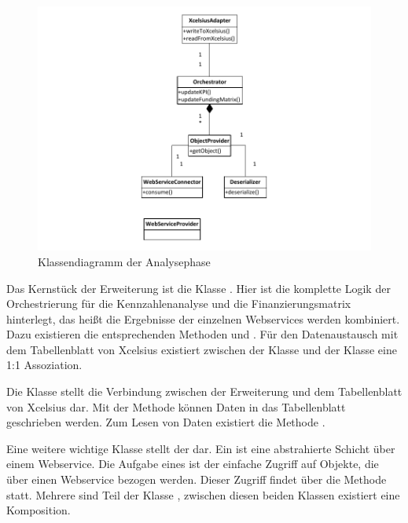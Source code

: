 \begin{onehalfspacing}
\begin{figure}[h]
\centering
\setlength{\unitlength}{1mm}
\includegraphics[width=15cm]{Visio/Analyse.pdf}
\caption{Klassendiagramm der Analysephase \label{fig:klassendiagramm_analyse}}
\end{figure} 

Das Kernstück der Erweiterung ist die Klasse . Hier ist die komplette Logik der Orchestrierung für die Kennzahlenanalyse und die Finanzierungsmatrix hinterlegt, das heißt die Ergebnisse der einzelnen Webservices werden kombiniert. Dazu existieren die entsprechenden Methoden  und . Für den Datenaustausch mit dem Tabellenblatt von \gls{Xcelsius} existiert zwischen der Klasse  und der Klasse  eine 1:1 Assoziation.

Die Klasse  stellt die Verbindung zwischen der Erweiterung und dem Tabellenblatt von \gls{Xcelsius} dar. Mit der Methode  können Daten in das Tabellenblatt geschrieben werden. Zum Lesen von Daten existiert die Methode .

Eine weitere wichtige Klasse stellt der  dar. Ein  ist eine abstrahierte Schicht über einem Webservice. Die Aufgabe eines  ist der einfache Zugriff auf Objekte, die über einen Webservice bezogen werden. Dieser Zugriff findet über die Methode  statt. Mehrere  sind Teil der Klasse , zwischen diesen beiden Klassen existiert eine Komposition.


\end{onehalfspacing}

